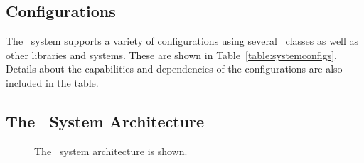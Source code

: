 \subsection{Configurations}



The \efloat\ system supports a variety of configurations
using several \efloatclass\ classes
as well as other libraries and systems.
These are shown in Table~\ref{table:systemconfigs}.
Details about the capabilities and dependencies of the
configurations are also included in the table.

\pagebreak

\subsection{The \efloathyperref\ System Architecture}\label{sec:architecture}

\begin{figure}[p]
\centering
{}
\vspace{2.0mm}
\caption{The \efloat\ system architecture is shown.}
\label{figure:architecture}
\end{figure}


